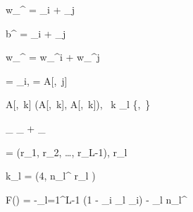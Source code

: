 w_{}^{} =
       {\varphi_i + \varphi_j}

b^{} =
       {\varphi_i + \varphi_j}

w_{}^{} = w_{}^{i} + w_{}^{j}


 = \; \varphi_i, \qquad
{} = \; A[,\, j]


A[,\, k] \leftarrow
  \max\bigl(A[,\, k],\; A[,\, k]\bigr),
  \quad \forall\, k \in {}_l \setminus \{,\, \}


\varphi_{} \leftarrow \varphi_{} + \varphi_{}


 = (r_1, r_2, \ldots, r_{L-1}), \quad r_l 


k_l = \max\!\left(4,\; \left\lfloor n_l^{} \cdot r_l \right\rfloor\right)


F() = -\sum_{l=1}^{L-1}
  \left(1 - 
                  {\displaystyle\sum_{i \in {}_l} \varphi_i}\right)
  \;-\; \lambda \cdot {}
                            {\displaystyle\sum_{l} n_l^{}}

